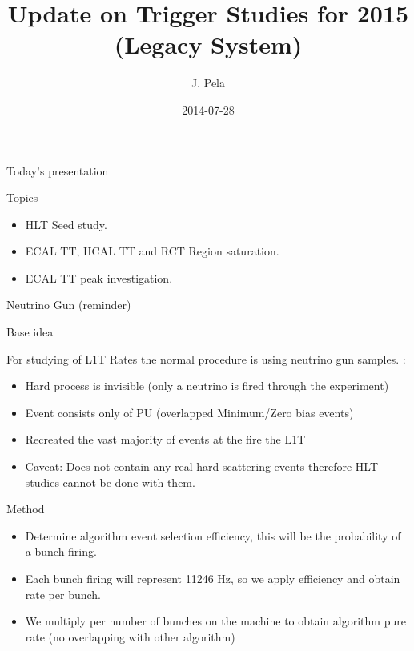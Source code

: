 \documentclass[8pt]{beamer}
\author[J. Pela]{J. Pela}
\title{Update on Trigger Studies for 2015 (Legacy System)}
\institute[ICL]{Imperial College London}
\date{2014-07-28}
\begin{document}
\setlength{\unitlength}{1mm}

\begin{frame}
  \titlepage
\end{frame}

\begin{frame}{Today's presentation}

\begin{block}{Topics}
 
\begin{itemize}
  \item HLT Seed study.
  \item ECAL TT, HCAL TT and RCT Region saturation.
  \item ECAL TT peak investigation.
\end{itemize}

\end{block}

\end{frame}

\begin{frame}{Neutrino Gun (reminder)}

\begin{block}{Base idea}
 
For studying of L1T Rates the normal procedure is using neutrino gun samples. :
\begin{itemize}
 \item Hard process is invisible (only a neutrino is fired through the experiment)
 \item Event consists only of PU (overlapped Minimum/Zero bias events)
 \item Recreated the vast majority of events at the fire the L1T
 \item Caveat: Does not contain any real hard scattering events therefore HLT studies cannot be done with them.
\end{itemize}

\end{block}

\begin{block}{Method}
 
\begin{itemize}
 \item Determine algorithm event selection efficiency, this will be the probability of a bunch firing.
 \item Each bunch firing will represent 11246 Hz, so we apply efficiency and obtain rate per bunch.
 \item We multiply per number of bunches on the machine to obtain algorithm pure rate (no overlapping with other algorithm)
\end{itemize}
 
\end{block}

\end{frame}
\end{document}
